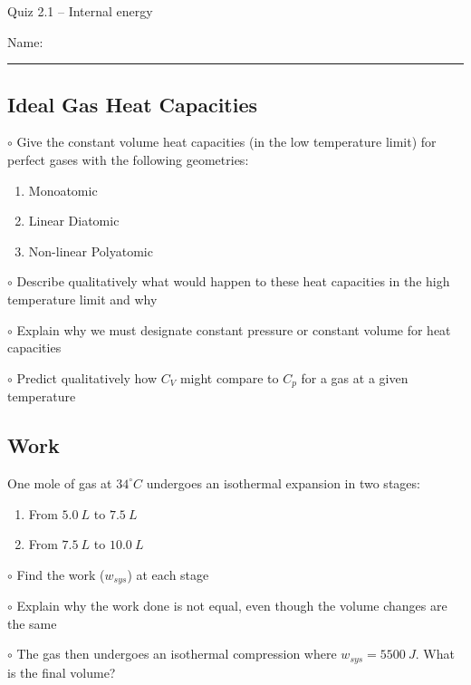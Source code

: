 \documentclass[11pt, letterpaper]{memoir}
\begin{document}
	\begin{center}
		{\large Quiz 2.1 --	Internal energy}
	\end{center}
	{\large Name: \rule[-1mm]{4in}{.1pt} 

\subsection*{Ideal Gas Heat Capacities}
$\circ$ Give the constant volume heat capacities (in the low temperature limit) for perfect gases with the following geometries:
\begin{enumerate}
	\item Monoatomic
	
	\vspace{1em}
	\item Linear Diatomic
	
	\vspace{1em}
	\item Non-linear Polyatomic	
\end{enumerate}


\vspace{1em}
\noindent$\circ$ Describe qualitatively what would happen to these heat capacities in the high temperature limit and why

\vspace{5em}
\noindent $\circ$ Explain why we must designate constant pressure or constant volume for heat capacities

\vspace{5em}
\noindent $\circ$ Predict qualitatively how $C_V$ might compare to $C_p$ for a gas at a given temperature

\vspace{15em}
\subsection*{Work}
One mole of gas at $34^\circ C$ undergoes an isothermal expansion in two stages:
\begin{enumerate}
	\item From $5.0~L$ to $7.5~L$
	\item From $7.5~L$ to $10.0~L$
\end{enumerate}
\noindent $\circ$ Find the work ($w_{sys}$) at each stage

\vspace{3em}
\noindent $\circ$ Explain why the work done is not equal, even though the volume changes are the same

\vspace{4em}
\noindent $\circ$ The gas then undergoes an isothermal compression where $w_{sys}=5500~J$. What is the final volume?

}
\end{document}
